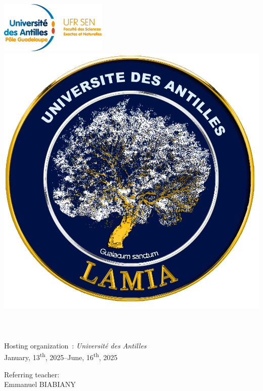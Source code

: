 \begin{titlepage}
	\begin{center}
		\includegraphics[scale=1.8]{../imgs/logo_ufr_sen.png}
		\hspace{2cm}
		\includegraphics[scale=0.1]{../imgs/logo_lamia_hd.png} \\[2cm]

		\HRule \\[0.4cm]
		\@title
		\HRule \\[1cm]

		\@author \\ [1.5cm]

		{\large Hosting organization~: \textsl{Université des Antilles}} \\[1.5cm]

		{\large January, 13\textsuperscript{th}, 2025–June, 16\textsuperscript{th}, 2025} \\ [2cm]

		\begin{minipage}{0.7\textwidth}
			\begin{flushleft}
				Referring teacher:\\
				\hspace{0.2cm}  Emmanuel \textsc{BIABIANY}
			\end{flushleft}
		\end{minipage}


\end{center}
\end{titlepage}
